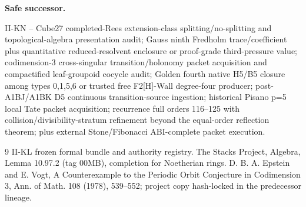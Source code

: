 \documentclass[9.5pt,a4paper]{article}
\begin{document}
\par\noindent\textbf{Safe successor.}\par\smallskip
\begin{minipage}{\linewidth}\scriptsize\raggedright\sloppy
II-KN -- Cube27 completed-Rees extension-class splitting/no-splitting and topological-algebra presentation audit; Gauss ninth Fredholm trace/coefficient plus quantitative reduced-resolvent enclosure or proof-grade third-pressure value; codimension-3 cross-singular transition/holonomy packet acquisition and compactified leaf-groupoid cocycle audit; Golden fourth native H5/B5 closure among types 0,1,5,6 or trusted free F2[H]-Wall degree-four producer; post-A1BJ/A1BK D5 continuous transition-source ingestion; historical Pisano p=5 local Tate packet acquisition; recurrence full orders 116--125 with collision/divisibility-stratum refinement beyond the equal-order reflection theorem; plus external Stone/Fibonacci ABI-complete packet execution.
\end{minipage}
\begin{thebibliography}{9}\small
{} II-KL frozen formal bundle and authority registry.
 The Stacks Project, Algebra, Lemma 10.97.2 (tag 00MB), completion for Noetherian rings.
 D. B. A. Epstein and E. Vogt, A Counterexample to the Periodic Orbit Conjecture in Codimension 3, Ann. of Math. 108 (1978), 539--552; project copy hash-locked in the predecessor lineage.
\end{thebibliography}
\end{document}
